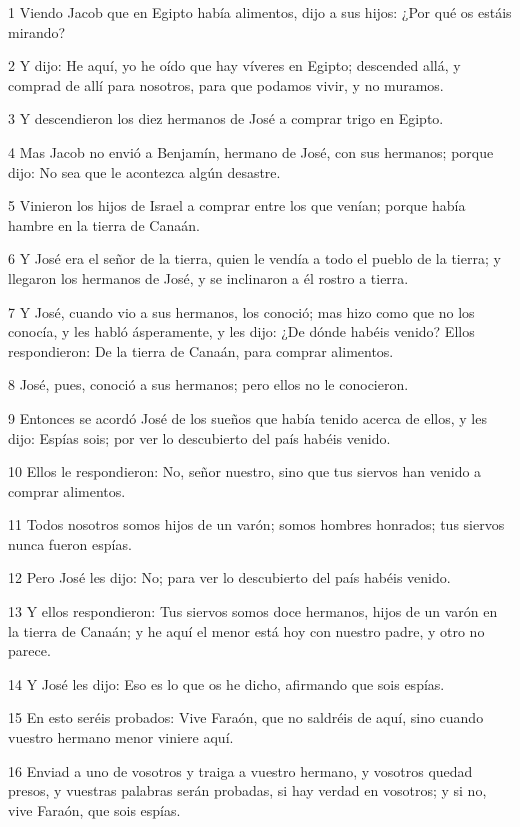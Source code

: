\par 1 Viendo Jacob que en Egipto había alimentos, dijo a sus hijos: ¿Por qué os estáis mirando?
\par 2 Y dijo: He aquí, yo he oído que hay víveres en Egipto; descended allá, y comprad de allí para nosotros, para que podamos vivir, y no muramos.
\par 3 Y descendieron los diez hermanos de José a comprar trigo en Egipto.
\par 4 Mas Jacob no envió a Benjamín, hermano de José, con sus hermanos; porque dijo: No sea que le acontezca algún desastre.
\par 5 Vinieron los hijos de Israel a comprar entre los que venían; porque había hambre en la tierra de Canaán.
\par 6 Y José era el señor de la tierra, quien le vendía a todo el pueblo de la tierra; y llegaron los hermanos de José, y se inclinaron a él rostro a tierra.
\par 7 Y José, cuando vio a sus hermanos, los conoció; mas hizo como que no los conocía, y les habló ásperamente, y les dijo: ¿De dónde habéis venido? Ellos respondieron: De la tierra de Canaán, para comprar alimentos.
\par 8 José, pues, conoció a sus hermanos; pero ellos no le conocieron.
\par 9 Entonces se acordó José de los sueños que había tenido acerca de ellos, y les dijo: Espías sois; por ver lo descubierto del país habéis venido.
\par 10 Ellos le respondieron: No, señor nuestro, sino que tus siervos han venido a comprar alimentos.
\par 11 Todos nosotros somos hijos de un varón; somos hombres honrados; tus siervos nunca fueron espías.
\par 12 Pero José les dijo: No; para ver lo descubierto del país habéis venido.
\par 13 Y ellos respondieron: Tus siervos somos doce hermanos, hijos de un varón en la tierra de Canaán; y he aquí el menor está hoy con nuestro padre, y otro no parece.
\par 14 Y José les dijo: Eso es lo que os he dicho, afirmando que sois espías.
\par 15 En esto seréis probados: Vive Faraón, que no saldréis de aquí, sino cuando vuestro hermano menor viniere aquí.
\par 16 Enviad a uno de vosotros y traiga a vuestro hermano, y vosotros quedad presos, y vuestras palabras serán probadas, si hay verdad en vosotros; y si no, vive Faraón, que sois espías.
